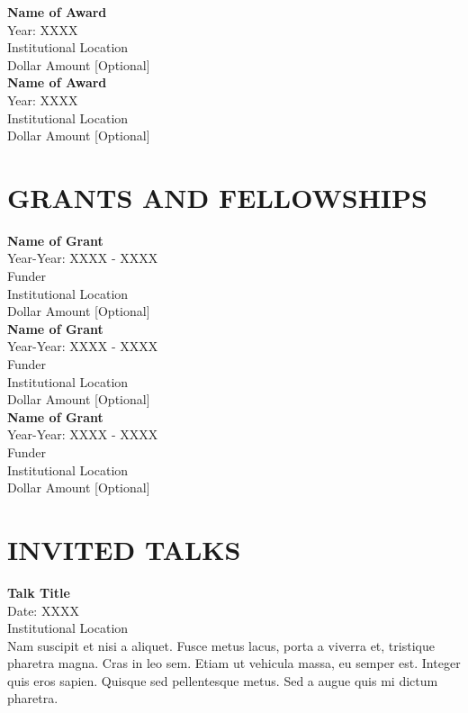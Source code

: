 \documentclass[a4paper,9pt]{extarticle}
\begin{document}
\noindent
\textbf{Name of Award} \\
Year: XXXX \\
Institutional Location \\
Dollar Amount [Optional]  \\

\noindent
\textbf{Name of Award} \\
Year: XXXX \\
Institutional Location \\
Dollar Amount [Optional]  


\section*{GRANTS AND FELLOWSHIPS}

\noindent
\newline 
\textbf{Name of Grant} \\
Year-Year: XXXX - XXXX\\
Funder \\
Institutional Location \\
Dollar Amount [Optional]  \\

\noindent
\textbf{Name of Grant} \\ 
Year-Year: XXXX - XXXX\\
Funder \\
Institutional Location \\
Dollar Amount [Optional]  \\

\noindent
\textbf{Name of Grant} \\ 
Year-Year: XXXX - XXXX\\
Funder \\
Institutional Location \\
Dollar Amount [Optional]  


\section*{INVITED TALKS}

\noindent
\newline 
\textbf{Talk Title} \\ 
Date: XXXX \\
Institutional Location \\
Nam suscipit et nisi a aliquet. Fusce metus lacus, porta a viverra et, tristique pharetra magna. Cras in leo sem. Etiam ut vehicula massa, eu semper est. Integer quis eros sapien. Quisque sed pellentesque metus. Sed a augue quis mi dictum pharetra. \\
\end{document}
